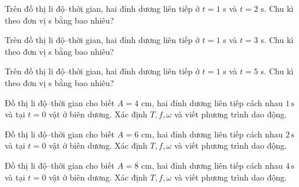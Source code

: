 \begin{ex}
Trên đồ thị li độ–thời gian, hai đỉnh dương liên tiếp ở $t=1$ s và $t=2$ s. Chu kì theo đơn vị s bằng bao nhiêu?
\end{ex}

\begin{ex}
Trên đồ thị li độ–thời gian, hai đỉnh dương liên tiếp ở $t=1$ s và $t=3$ s. Chu kì theo đơn vị s bằng bao nhiêu?
\end{ex}

\begin{ex}
Trên đồ thị li độ–thời gian, hai đỉnh dương liên tiếp ở $t=1$ s và $t=5$ s. Chu kì theo đơn vị s bằng bao nhiêu?
\end{ex}

\begin{ex}
Đồ thị li độ–thời gian cho biết $A=4$ cm, hai đỉnh dương liên tiếp cách nhau $1\,\text{s}$ và tại $t=0$ vật ở biên dương. Xác định $T,f,\omega$ và viết phương trình dao động.
\choiceTF

\end{ex}

\begin{ex}
Đồ thị li độ–thời gian cho biết $A=6$ cm, hai đỉnh dương liên tiếp cách nhau $2\,\text{s}$ và tại $t=0$ vật ở biên dương. Xác định $T,f,\omega$ và viết phương trình dao động.
\choiceTF

\end{ex}

\begin{ex}
Đồ thị li độ–thời gian cho biết $A=8$ cm, hai đỉnh dương liên tiếp cách nhau $4\,\text{s}$ và tại $t=0$ vật ở biên dương. Xác định $T,f,\omega$ và viết phương trình dao động.
\choiceTF

\end{ex}

